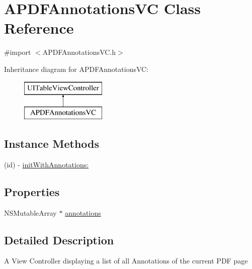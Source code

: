 \hypertarget{interface_a_p_d_f_annotations_v_c}{\section{A\-P\-D\-F\-Annotations\-V\-C Class Reference}
\label{interface_a_p_d_f_annotations_v_c}
}


{\ttfamily \#import $<$A\-P\-D\-F\-Annotations\-V\-C.\-h$>$}

Inheritance diagram for A\-P\-D\-F\-Annotations\-V\-C\-:\begin{figure}[H]
\begin{center}
\leavevmode
\includegraphics[height=2.000000cm]{interface_a_p_d_f_annotations_v_c}
\end{center}
\end{figure}
\subsection*{Instance Methods}
\begin{DoxyCompactItemize}
\item 
(id) -\/ \hyperlink{interface_a_p_d_f_annotations_v_c_a4456642be0638e20d2ee525d25efea4f}{init\-With\-Annotations\-:}
\end{DoxyCompactItemize}
\subsection*{Properties}
\begin{DoxyCompactItemize}
\item 
N\-S\-Mutable\-Array $\ast$ \hyperlink{interface_a_p_d_f_annotations_v_c_aff28f6b1e3807f0ccf1229bc467deafe}{annotations}
\end{DoxyCompactItemize}


\subsection{Detailed Description}
A View Controller displaying a list of all Annotations of the current P\-D\-F page 

